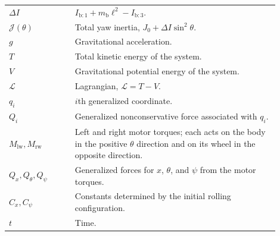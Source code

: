 \documentclass[journal]{IEEEtran}
\begin{document}
\begin{table}[H]
\begin{tabular}{
    >{\raggedright\arraybackslash}p{0.22\linewidth}
    >{\raggedright\arraybackslash}p{0.68\linewidth}
}
$\Delta I$
& $I_{\mathrm b:1}+m_{\mathrm b}\ell^2-I_{\mathrm b:3}$. \\

$\mathcal{J}(\theta)$
& Total yaw inertia, $J_0+\Delta I\sin^2\theta$. \\

$g$
& Gravitational acceleration. \\

$T$
& Total kinetic energy of the system. \\

$V$
& Gravitational potential energy of the system. \\

$\mathcal{L}$
& Lagrangian, $\mathcal{L}=T-V$. \\

$q_i$
& $i$th generalized coordinate. \\

$Q_i$
& Generalized nonconservative force associated with $q_i$. \\

$M_{\mathrm{lw}},M_{\mathrm{rw}}$
& Left and right motor torques; each acts on the body in the positive
$\theta$ direction and on its wheel in the opposite direction. \\

$Q_x,Q_\theta,Q_\psi$
& Generalized forces for $x$, $\theta$, and $\psi$ from the motor torques. \\

$C_x,C_\psi$
& Constants determined by the initial rolling configuration. \\

$t$
& Time. \\

\bottomrule
\end{tabular}
\end{table}
\end{document}
